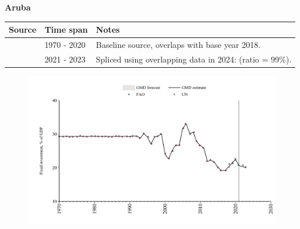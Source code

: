 \documentclass[12pt,a4paper,landscape]{article}
\begin{document}
\begin{adjustbox}{max totalsize={\paperwidth}{\paperheight},center}
\begin{minipage}[t][\textheight][t]{\textwidth}
\vspace*{0.5cm}
{}
\begin{center}
{\Large\bfseries Aruba}
\end{center}
\vspace{0.5cm}
\begin{table}[H]
\centering
\small
\begin{tabular}{|l|l|l|}
\hline
\textbf{Source} & \textbf{Time span} & \textbf{Notes} \\
\hline
\rowcolor{white}\cite{UN}& 1970 - 2020 &Baseline source, overlaps with base year 2018.\\
\rowcolor{lightgray}\cite{FAO}& 2021 - 2023 &Spliced using overlapping data in 2024: (ratio = 99\%).\\
\hline
\end{tabular}
\end{table}
\begin{figure}[H]
\centering
\includegraphics[width=\textwidth,height=0.6\textheight,keepaspectratio]{graphs/ABW_finv_GDP.pdf}
\end{figure}
\end{minipage}
\end{adjustbox}
\end{document}
